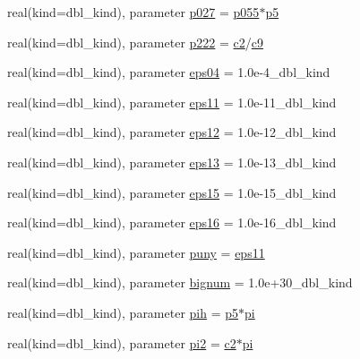 \begin{DoxyCompactItemize}
\item 
real(kind=dbl\_\-kind), parameter \hyperlink{namespaceice__constants_a6508f5f80299f19154df1721ee97fc85}{p027} = \hyperlink{namespaceice__constants_aa715e54741a308eed3ebb5bfe30d82c2}{p055}$\ast$\hyperlink{namespaceice__constants_a26872e9df91fb7484a1a2ddefd7b71b0}{p5}
\item 
real(kind=dbl\_\-kind), parameter \hyperlink{namespaceice__constants_af98444617c032204077b878268b3dbd8}{p222} = \hyperlink{namespaceice__constants_a683e0c28523a17a5d2cd40066167570a}{c2}/\hyperlink{namespaceice__constants_a8fad19fc3e19d7387132c4b3184f62d8}{c9}
\item 
real(kind=dbl\_\-kind), parameter \hyperlink{namespaceice__constants_a05332a868b891940e57c06ddeab5963a}{eps04} = 1.0e-\/4\_\-dbl\_\-kind
\item 
real(kind=dbl\_\-kind), parameter \hyperlink{namespaceice__constants_a702360aa78f70d763c2c4d3d3215d980}{eps11} = 1.0e-\/11\_\-dbl\_\-kind
\item 
real(kind=dbl\_\-kind), parameter \hyperlink{namespaceice__constants_af654cc2413a18dc60cad29fbca635544}{eps12} = 1.0e-\/12\_\-dbl\_\-kind
\item 
real(kind=dbl\_\-kind), parameter \hyperlink{namespaceice__constants_a835bbe6345af20f392af6fe0435418df}{eps13} = 1.0e-\/13\_\-dbl\_\-kind
\item 
real(kind=dbl\_\-kind), parameter \hyperlink{namespaceice__constants_a9ed2ee5022e4e58858972ed5dc16f9c2}{eps15} = 1.0e-\/15\_\-dbl\_\-kind
\item 
real(kind=dbl\_\-kind), parameter \hyperlink{namespaceice__constants_a31903ce34884165d6861b9004305bc01}{eps16} = 1.0e-\/16\_\-dbl\_\-kind
\item 
real(kind=dbl\_\-kind), parameter \hyperlink{namespaceice__constants_af5d2a72e22e7a53706b6a41ba932a67d}{puny} = \hyperlink{namespaceice__constants_a702360aa78f70d763c2c4d3d3215d980}{eps11}
\item 
real(kind=dbl\_\-kind), parameter \hyperlink{namespaceice__constants_aec49cf5831029133481512d9f8aed25c}{bignum} = 1.0e+30\_\-dbl\_\-kind
\item 
real(kind=dbl\_\-kind), parameter \hyperlink{namespaceice__constants_a402bb772e4dd1130d8c9f19554e7fd4e}{pih} = \hyperlink{namespaceice__constants_a26872e9df91fb7484a1a2ddefd7b71b0}{p5}$\ast$\hyperlink{namespaceice__constants_ab88fe0d16ebc9529ef11d6fe4343c387}{pi}
\item 
real(kind=dbl\_\-kind), parameter \hyperlink{namespaceice__constants_ab0deb719f4161aeebe0b844228c8cf65}{pi2} = \hyperlink{namespaceice__constants_a683e0c28523a17a5d2cd40066167570a}{c2}$\ast$\hyperlink{namespaceice__constants_ab88fe0d16ebc9529ef11d6fe4343c387}{pi}

\end{DoxyCompactItemize}
